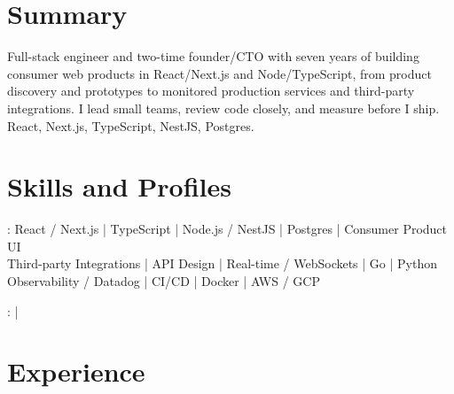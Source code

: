 \documentclass[print]{jack-resume}
\begin{document}
\pagecolor{darkmodeBackground}


\begin{minipage}[t][1cm][t]{.03\textwidth}
    \hfill
\end{minipage}

\section{Summary}
Full-stack engineer and two-time founder/CTO with seven years of building consumer web products in React/Next.js and Node/TypeScript, from product discovery and prototypes to monitored production services and third-party integrations. I lead small teams, review code closely, and measure before I ship. React, Next.js, TypeScript, NestJS, Postgres.
\sectionsep

\section{Skills and Profiles}
:
React / Next.js \hfill | \hfill
TypeScript \hfill | \hfill
Node.js / NestJS \hfill | \hfill
Postgres \hfill | \hfill
Consumer Product UI \\
\hspace{1.0cm} Third-party Integrations \hfill | \hfill
API Design \hfill | \hfill
Real-time / WebSockets \hfill | \hfill
Go \hfill | \hfill
Python \\
\hspace{1.0cm} Observability / Datadog \hfill | \hfill
CI/CD \hfill | \hfill
Docker \hfill | \hfill
AWS / GCP \\

\raggedright{
    :
      \href{https://www.linkedin.com/in/jack-sturtevant/}{ \ExternalLink} |
     \href{https://github.com/jacksturt}{ \ExternalLink}}

\section{Experience}
\end{document}

